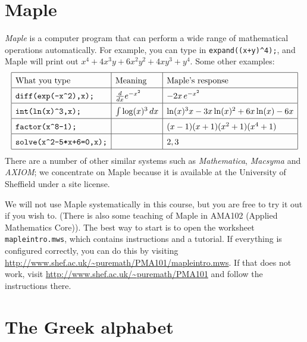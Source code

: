 \documentclass[a4paper]{book}
\newcommand{\PURPLE}[1]{{\color{purple}#1}}
\renewcommand{\:}{\colon}
\newcommand{\DEFN}[1]{\PURPLE{\emph{#1}}}
\theoremstyle{definition}
\begin{document}
\chapter{Maple}
\label{apx-maple}

\DEFN{Maple} is a computer program that can perform a wide range of
mathematical operations automatically.  For example, you can type in
\verb!expand((x+y)^4);!, and Maple will print out
$x^4+4x^3y+6x^2y^2+4xy^3+y^4$.  Some other examples:
\[ \renewcommand{\arraystretch}{1.5} \begin{array}{|l|l|l|}
 \hline
 \text{What you type} & \text{Meaning} &
  \text{Maple's response} \\ \hline
 \verb!diff(exp(-x^2),x);! & \frac{d}{dx} e^{-x^2} &
  -2x\,e^{-x^2} \\ \hline
 \verb!int(ln(x)^3,x);! & \int \log(x)^3\,dx & 
  \ln(x)^3 x - 3x\ln(x)^2 + 6 x\ln(x) -6x \\ \hline
 \verb!factor(x^8-1);! && (x-1)(x+1)(x^2+1)(x^4+1) \\ \hline
 \verb!solve(x^2-5*x+6=0,x);! && 2,3  \\ \hline
\end{array} \]
There are a number of other similar systems such as
\DEFN{Mathematica}, \DEFN{Macsyma} and \DEFN{AXIOM}; we concentrate on
Maple because it is available at the University of Sheffield under a
site license.

We will not use Maple systematically in this course, but you are free
to try it out if you wish to.  (There is also some teaching of Maple
in AMA102 (Applied Mathematics Core)).  The best way to start is to
open the worksheet \verb+mapleintro.mws+, which contains instructions
and a tutorial.  If everything is configured correctly, you can do
this by visiting
\url{http://www.shef.ac.uk/~puremath/PMA101/mapleintro.mws}.  If that
does not work, visit \url{http://www.shef.ac.uk/~puremath/PMA101} and
follow the instructions there.

\chapter{The Greek alphabet}
\label{apx-greek}
\end{document}

